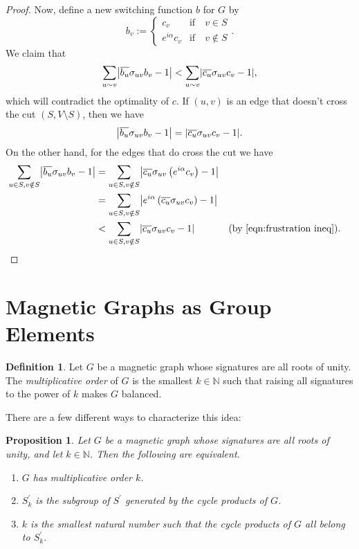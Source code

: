 \documentclass[12pt]{article}
\newtheorem{prop}[thm]{Proposition}
\theoremstyle{definition}
\newtheorem{defn}[thm]{Definition}
\newcommand{\N}{\mathbb N}
\DeclarePairedDelimiter\abs{\lvert}{\rvert}
\begin{document}
\begin{proof}
Now, define a new switching function $b$ for $G$ by 
$$
b_v :=
\begin{cases}
c_v &\mbox{if} \quad v \in S \\
e^{i \alpha} c_v &\mbox{if} \quad v \notin S 
\end{cases}.
$$
We claim that 
$$\sum_{u \sim v}\abs*{\overline{b_u} \sigma_{uv} b_v - 1} < \sum_{u \sim v}\abs*{\overline{c_u} \sigma_{uv} c_v - 1},$$
which will contradict the optimality of $c$. If $(u, v)$ is an edge that doesn't cross the cut $(S, V \setminus S)$, then we have 
$$
\abs*{\overline{b_u} \sigma_{uv} b_v - 1} = \abs*{\overline{c_u} \sigma_{uv} c_v - 1}.
$$
On the other hand, for the edges that do cross the cut we have 
\begin{align*}
\sum_{u \in S, v \notin S} \abs*{\overline{b_u} \sigma_{uv} b_v - 1}
&= \sum_{u \in S, v \notin S} \abs*{\overline{c_u} \sigma_{uv} \left(e^{i \alpha} c_v \right) - 1} \\
&= \sum_{u \in S, v \notin S} \abs*{e^{i \alpha} \left( \overline{c_u} \sigma_{uv} c_v \right) - 1} \\
&< \sum_{u \in S, v \notin S} \abs*{\overline{c_u} \sigma_{uv} c_v - 1} && \text{(by \cref{eqn:frustration ineq})}.
\end{align*}
\end{proof}

\pagebreak
\section{Magnetic Graphs as Group Elements}
\begin{defn}
Let $G$ be a magnetic graph whose signatures are all roots of unity. The \textit{multiplicative order} of $G$ is the smallest $k \in \N$ such that raising all signatures to the power of $k$ makes $G$ balanced.
\end{defn}

There are a few different ways to characterize this idea:

\begin{prop}\label{characterizations of multiplicative order}
Let $G$ be a magnetic graph whose signatures are all roots of unity, and let $k \in \N$.  Then the following are equivalent.
\begin{enumerate}
\item $G$ has multiplicative order $k$.
\item $S^\prime_k$ is the subgroup of $S^\prime$ generated by the cycle products of $G$.
\item $k$ is the smallest natural number such that the cycle products of $G$ all belong to $S^\prime_k$. 
\end{enumerate}
\end{prop}
\end{document}
